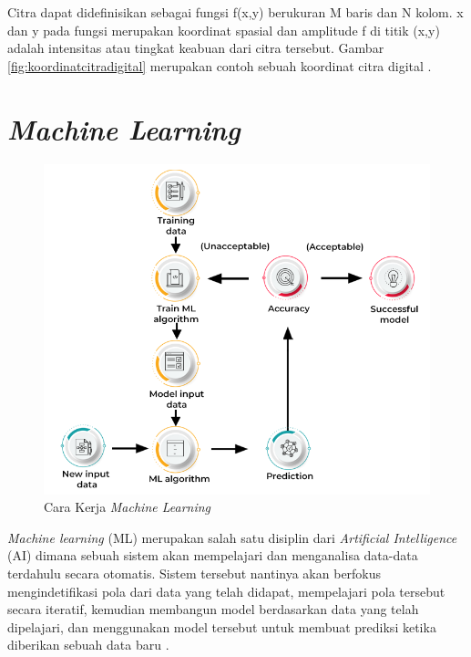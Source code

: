 Citra dapat didefinisikan sebagai fungsi f(x,y) berukuran M baris dan N kolom. x dan y pada fungsi merupakan koordinat 
spasial dan amplitude f di titik (x,y) adalah intensitas atau tingkat keabuan dari citra tersebut. Gambar 
\ref{fig:koordinatcitradigital} merupakan contoh sebuah koordinat citra digital \parencite{Putra2010}.

\section{\emph{Machine Learning}}
\label{sec:machinelearning}

\begin{figure}[ht]
  \centering
  \includegraphics[scale=0.5]{gambar/How Machine learning work.png}
  \caption{Cara Kerja \emph{Machine Learning}}
  \label{fig:carakerjamachinelearning}
\end{figure}

\emph{Machine learning} (ML) merupakan salah satu disiplin dari \emph{Artificial Intelligence} (AI) dimana sebuah sistem akan 
mempelajari dan menganalisa data-data terdahulu secara otomatis. Sistem tersebut nantinya akan berfokus mengindetifikasi 
pola dari data yang telah didapat, mempelajari pola tersebut secara iteratif, kemudian membangun model berdasarkan data 
yang telah dipelajari, dan menggunakan model tersebut untuk membuat prediksi ketika diberikan sebuah data baru \parencite{Russel2021}.

